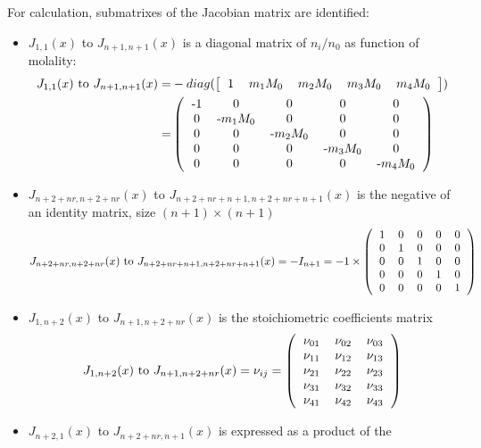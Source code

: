 \documentclass[onecolumn]{article}
\begin{document}
For calculation, submatrixes of the Jacobian matrix are identified:
\begin{itemize}
\item $J_{1,1}(x)$ to $J_{n+1,n+1}(x)$ is a diagonal matrix of $n_i/n_0$
as function of molality:
\[
\begin{aligned}
J_{1,1}(x) \text{ to } J_{n+1,n+1}(x) = &
-diag( \left[
\begin{tabular}{ccccc}
1 & $m_1 M_0$ & $m_2 M_0$ & $m_3 M_0$ & $m_4 M_0$\\
\end{tabular}
\right]
)\\
= & \left(
\begin{tabular}{ccccc}
-1 & 0 & 0 & 0 & 0\\
0 & -$m_1 M_0$ & 0 & 0 & 0\\
0 & 0 & -$m_2 M_0$ & 0 & 0\\
0 & 0 & 0 & -$m_3 M_0$ & 0\\
0 & 0 & 0 & 0 & -$m_4 M_0$\\
\end{tabular}
\right)
\end{aligned}
\]
\item $J_{n+2+nr,n+2+nr}(x)$ to $J_{n+2+nr+n+1,n+2+nr+n+1}(x)$
is the negative of an identity matrix, size $(n+1) \times (n+1)$
\[
J_{n+2+nr,n+2+nr}(x) \text{ to } J_{n+2+nr+n+1,n+2+nr+n+1}(x) =
-I_{n+1} = -1\times \left(
\begin{tabular}{ccccc}
1 & 0 & 0 & 0 & 0\\
0 & 1 & 0 & 0 & 0\\
0 & 0 & 1 & 0 & 0\\
0 & 0 & 0 & 1 & 0\\
0 & 0 & 0 & 0 & 1\\
\end{tabular}
\right)
\]
\item $J_{1,n+2}(x)$ to $J_{n+1,n+2+nr}(x)$ is the stoichiometric coefficients
matrix
\[
J_{1,n+2}(x) \text{ to } J_{n+1,n+2+nr}(x) = \nu_{ij} =\left(
\begin{tabular}{ccc}
$\nu_{01}$ & $\nu_{02}$ & $\nu_{03}$\\
$\nu_{11}$ & $\nu_{12}$ & $\nu_{13}$\\
$\nu_{21}$ & $\nu_{22}$ & $\nu_{23}$\\
$\nu_{31}$ & $\nu_{32}$ & $\nu_{33}$\\
$\nu_{41}$ & $\nu_{42}$ & $\nu_{43}$\\
\end{tabular}
\right)
\]
\item $J_{n+2,1}(x)$ to $J_{n+2+nr,n+1}(x)$ is expressed as a product of the

\end{itemize}
\end{document}
